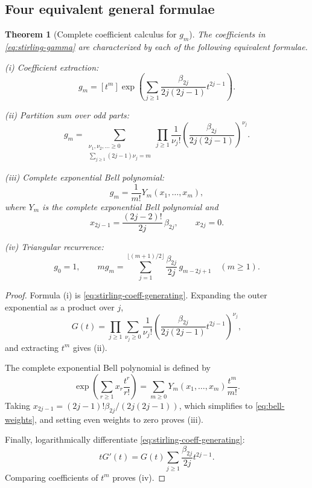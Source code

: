 \documentclass[11pt,oneside]{article}
\numberwithin{equation}{section}
\newtheorem{theorem}{Theorem}[section]
\newcommand{\Coeff}[2]{[#1^{#2}]}
\newcommand{\paren}[1]{\left(#1\right)}
\begin{document}
\subsection{Four equivalent general formulae}

\begin{theorem}[Complete coefficient calculus for \(g_m\)]
\label{thm:gm-formulas}
The coefficients in \cref{eq:stirling-gamma} are characterized by each of the following equivalent formulae.

\emph{(i) Coefficient extraction:}
\begin{equation}
 g_m=\Coeff{t}{m}
 \exp\!\left(
   \sum_{j\ge1}\frac{\beta_{2j}}{2j(2j-1)}t^{2j-1}
 \right).
 \label{eq:gm-coefficient-extraction}
\end{equation}

\emph{(ii) Partition sum over odd parts:}
\begin{equation}
 \boxed{\displaystyle
 g_m=
 \sum_{\substack{\nu_1,\nu_2,\ldots\ge0\\
       \sum_{j\ge1}(2j-1)\nu_j=m}}
 \prod_{j\ge1}\frac{1}{\nu_j!}
 \paren{\frac{\beta_{2j}}{2j(2j-1)}}^{\nu_j}.}
 \label{eq:gm-partition-sum}
\end{equation}

\emph{(iii) Complete exponential Bell polynomial:}
\begin{equation}
 \boxed{\displaystyle
 g_m=\frac1{m!}Y_m(x_1,\ldots,x_m),}
 \label{eq:gm-bell-polynomial}
\end{equation}
where \(Y_m\) is the complete exponential Bell polynomial and
\begin{equation}
 x_{2j-1}=\frac{(2j-2)!}{2j}\,\beta_{2j},
 \qquad x_{2j}=0.
 \label{eq:bell-weights}
\end{equation}

\emph{(iv) Triangular recurrence:}
\begin{equation}
 \boxed{\displaystyle
 g_0=1,
 \qquad
 m g_m=\sum_{j=1}^{\lfloor(m+1)/2\rfloor}
 \frac{\beta_{2j}}{2j}\,g_{m-2j+1}
 \quad(m\ge1).}
 \label{eq:gm-recurrence}
\end{equation}
\end{theorem}

\begin{proof}
Formula (i) is \cref{eq:stirling-coeff-generating}.  Expanding the outer exponential as a product over \(j\),
\[
 G(t)=\prod_{j\ge1}
 \sum_{\nu_j\ge0}\frac1{\nu_j!}
 \paren{\frac{\beta_{2j}}{2j(2j-1)}t^{2j-1}}^{\nu_j},
\]
and extracting \(t^m\) gives (ii).

The complete exponential Bell polynomial is defined by
\[
 \exp\!\paren{\sum_{r\ge1}x_r\frac{t^r}{r!}}
 =\sum_{m\ge0}Y_m(x_1,\ldots,x_m)\frac{t^m}{m!}.
\]
Taking \(x_{2j-1}=(2j-1)!\beta_{2j}/(2j(2j-1))\), which simplifies to \cref{eq:bell-weights}, and setting even weights to zero proves (iii).

Finally, logarithmically differentiate \cref{eq:stirling-coeff-generating}:
\[
 tG'(t)=G(t)
 \sum_{j\ge1}\frac{\beta_{2j}}{2j}t^{2j-1}.
\]
Comparing coefficients of \(t^m\) proves (iv).
\end{proof}
\end{document}
